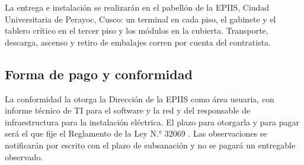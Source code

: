 La entrega e instalación se realizarán en el pabellón de la EPIIS, Ciudad Universitaria de Perayoc, Cusco: un terminal en cada piso, el gabinete y el tablero crítico en el tercer piso y los módulos en la cubierta. Transporte, descarga, ascenso y retiro de embalajes corren por cuenta del contratista.

\subsection{Forma de pago y conformidad}
La conformidad la otorga la Dirección de la EPIIS como área usuaria, con informe técnico de TI para el software y la red y del responsable de infraestructura para la instalación eléctrica. El plazo para otorgarla y para pagar será el que fije el Reglamento de la Ley N.° 32069 \cite{contrataciones}. Las observaciones se notificarán por escrito con el plazo de subsanación y no se pagará un entregable observado.

